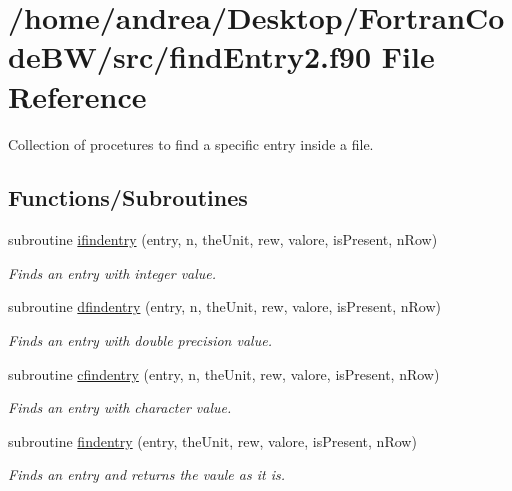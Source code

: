 \hypertarget{find_entry2_8f90}{\section{/home/andrea/\-Desktop/\-Fortran\-Code\-B\-W/src/find\-Entry2.f90 File Reference}
\label{find_entry2_8f90}
}


Collection of procetures to find a specific entry inside a file.  


\subsection*{Functions/\-Subroutines}
\begin{DoxyCompactItemize}
\item 
subroutine \hyperlink{find_entry2_8f90_a708156401460d527e8e70817b460bf8d}{ifindentry} (entry, n, the\-Unit, rew, valore, is\-Present, n\-Row)
\begin{DoxyCompactList}\small\item\em Finds an entry with integer value. \end{DoxyCompactList}\item 
subroutine \hyperlink{find_entry2_8f90_ab66eb6763b6ded668652e5783b3a5e80}{dfindentry} (entry, n, the\-Unit, rew, valore, is\-Present, n\-Row)
\begin{DoxyCompactList}\small\item\em Finds an entry with double precision value. \end{DoxyCompactList}\item 
subroutine \hyperlink{find_entry2_8f90_a82fb26aa686ac91d56422f8405ba79fb}{cfindentry} (entry, n, the\-Unit, rew, valore, is\-Present, n\-Row)
\begin{DoxyCompactList}\small\item\em Finds an entry with character value. \end{DoxyCompactList}\item 
subroutine \hyperlink{find_entry2_8f90_a5588807ee16232625f0911c02c0a7af9}{findentry} (entry, the\-Unit, rew, valore, is\-Present, n\-Row)
\begin{DoxyCompactList}\small\item\em Finds an entry and returns the vaule as it is. \end{DoxyCompactList}\end{DoxyCompactItemize}


